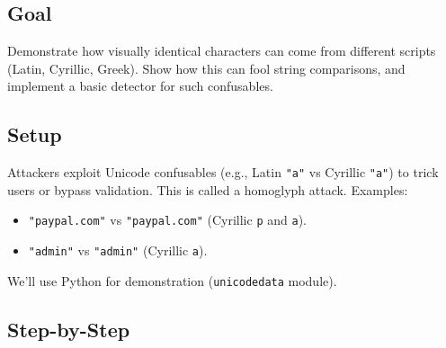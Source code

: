 \documentclass[
  letterpaper,
  DIV=11,
  numbers=noendperiod]{scrreprt}
\providecommand{\tightlist}{%
  \setlength{\itemsep}{0pt}\setlength{\parskip}{0pt}}
\begin{document}
\subsection{Goal}\label{goal-8}

Demonstrate how visually identical characters can come from different
scripts (Latin, Cyrillic, Greek). Show how this can fool string
comparisons, and implement a basic detector for such confusables.

\subsection{Setup}\label{setup-8}

Attackers exploit Unicode confusables (e.g., Latin \texttt{"a"} vs
Cyrillic \texttt{"а"}) to trick users or bypass validation. This is
called a homoglyph attack. Examples:

\begin{itemize}
\tightlist
\item
  \texttt{"paypal.com"} vs \texttt{"раураl.com"} (Cyrillic \texttt{р}
  and \texttt{а}).
\item
  \texttt{"admin"} vs \texttt{"аdmin"} (Cyrillic \texttt{а}).
\end{itemize}

We'll use Python for demonstration (\texttt{unicodedata} module).

\subsection{Step-by-Step}\label{step-by-step-8}
\end{document}
